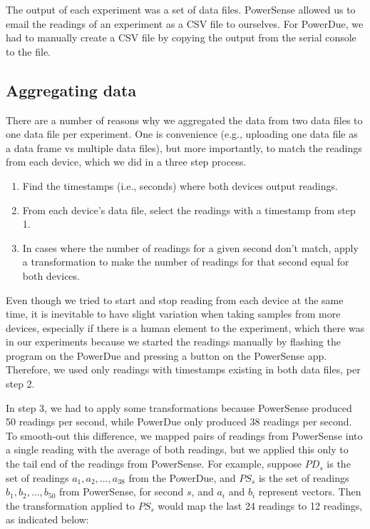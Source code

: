 \documentclass[journal]{IEEEtranTIE}
\begin{document}
\begin{enumerate}
\begin{enumerate}
The output of each experiment was a set of data files. PowerSense allowed us to
email the readings of an experiment as a CSV file to ourselves. For PowerDue, we
had to manually create a CSV file by copying the output from the serial console
to the file.

\subsection{Aggregating data}

There are a number of reasons why we aggregated the data from two data files to
one data file per experiment. One is convenience (e.g., uploading one data file
as a data frame vs multiple data files), but more importantly, to match the
readings from each device, which we did in a three step process.

\begin{enumerate}
\item Find the timestamps (i.e., seconds) where both devices output readings.
\item From each device's data file, select the readings with a timestamp from
      step 1.
\item In cases where the number of readings for a given second don't match,
      apply a transformation to make the number of readings for that second
      equal for both devices.
\end{enumerate}

Even though we tried to start and stop reading from each device at the same
time, it is inevitable to have slight variation when taking samples from more
devices, especially if there is a human element to the experiment, which there
was in our experiments because we started the readings manually by flashing the
program on the PowerDue and pressing a button on the PowerSense app.
Therefore, we used only readings with timestamps existing in both data files,
per step 2.

In step 3, we had to apply some transformations because PowerSense produced 50
readings per second, while PowerDue only produced 38 readings per second. To
smooth-out this difference, we mapped pairs of readings from PowerSense into a
single reading with the average of both readings, but we applied this only to
the tail end of the readings from PowerSense. For example, suppose $PD_s$ is the
set of readings $a_1, a_2, ..., a_{38}$ from the PowerDue, and $PS_s$ is the set
of readings $b_1, b_2, ..., b_{50}$ from PowerSense, for second $s$, and $a_i$
and $b_i$ represent vectors. Then the transformation applied to $PS_s$ would map
the last 24 readings to 12 readings, as indicated below:


\end{enumerate}
\end{enumerate}
\end{document}
